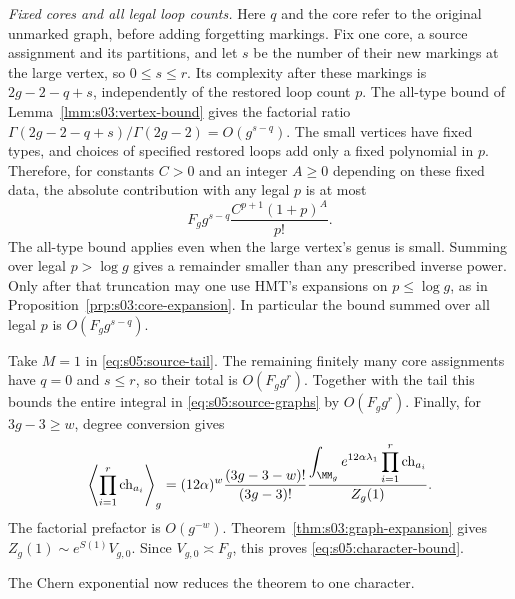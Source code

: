 \begin{prf}
\emph{Fixed cores and all legal loop counts.}
Here $q$ and the core refer to the original unmarked graph, before
adding forgetting markings. Fix one core, a source assignment and
its partitions, and let $s$ be the number of their new markings at
the large vertex, so $0\leq s\leq r$. Its complexity after these
markings is $2g-2-q+s$, independently of the restored loop count
$p$. The all-type bound of Lemma~\ref{lmm:s03:vertex-bound} gives
the factorial ratio
$\Gamma(2g-2-q+s)/\Gamma(2g-2)=O(g^{s-q})$.
The small vertices have fixed types, and choices of specified
restored loops add only a fixed polynomial in $p$. Therefore, for
constants $C>0$ and an integer $A\geq0$ depending on these fixed
data, the absolute contribution with any legal $p$ is at most
\begin{equation}\label{eq:s05:decorated-core-bound}
 F_g g^{s-q}\frac{C^{p+1}(1+p)^A}{p!}.
\end{equation}
The all-type bound applies even when the large vertex's genus is
small. Summing over legal $p>\log g$ gives a remainder smaller
than any prescribed inverse power. Only after that truncation may
one use HMT's expansions on $p\leq\log g$, as in
Proposition~\ref{prp:s03:core-expansion}. In particular the bound
summed over all legal $p$ is $O(F_g g^{s-q})$.

Take $M=1$ in \eqref{eq:s05:source-tail}. The remaining finitely
many core assignments have $q=0$ and $s\leq r$, so their total is
$O(F_g g^r)$. Together with the tail this bounds the entire
integral in \eqref{eq:s05:source-graphs} by $O(F_g g^r)$.
Finally, for $3g-3\geq w$, degree conversion gives
\begin{equation}\label{eq:s05:character-normalization}
 \left\langle\prod_{i=1}^r\mathrm{ch}_{a_i}\right\rangle_g
 =(12\alpha)^w\frac{(3g-3-w)!}{(3g-3)!}
 \frac{\displaystyle\int_{\MM_g}e^{12\alpha\lambda_1}
                    \prod_{i=1}^r\mathrm{ch}_{a_i}}
      {Z_g(1)}.
\end{equation}
The factorial prefactor is $O(g^{-w})$.
Theorem~\ref{thm:s03:graph-expansion} gives
$Z_g(1)\sim e^{S(1)}V_{g,0}$.
Since $V_{g,0}\asymp F_g$, this proves
\eqref{eq:s05:character-bound}.
\end{prf}

The Chern exponential now reduces the theorem to one character.

